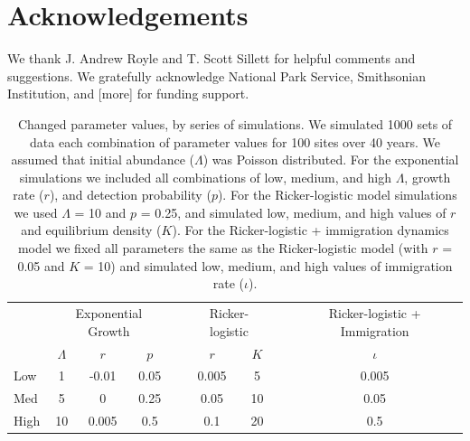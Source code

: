 \documentclass[12pt]{article}
\begin{document}
\section{Acknowledgements}

We thank J. Andrew Royle and T. Scott Sillett for helpful
comments and suggestions. We gratefully acknowledge National Park 
Service, Smithsonian Institution, and [more] for funding support.




\newpage



\begin{table}[t]
  \centering
\caption{Changed parameter values, by series of simulations.  We
simulated 1000 sets of data each combination of parameter values
for 100 sites over 40 years.  We assumed that initial abundance
($\Lambda$) was Poisson distributed.  For the exponential 
simulations we included all combinations of low, medium, and
high $\Lambda$, growth rate ($r$), and detection probability ($p$).
For the Ricker-logistic model simulations we used $\Lambda$ = 10 and $p$ = 0.25, and
simulated low, medium, and high values of $r$ and equilibrium density ($K$).
For the Ricker-logistic + immigration dynamics model we fixed all parameters the
same as the Ricker-logistic model (with $r$ = 0.05 and $K$ = 10) and
simulated low, medium, and high values of immigration rate ($\iota$).}  
\begin{tabular}{lcccccccc}
    \hline
    & \multicolumn{3}{c}{Exponential Growth} && \multicolumn{2}{c}{Ricker-logistic} &&
    Ricker-logistic + Immigration \\
    \cline{2-4}     \cline{6-7}    \cline{9-9}
& $\Lambda$ & $r$ & $p$ && $r$  & $K$ && $\iota$  \\    
\hline
    Low	        &1	&-0.01	&0.05	&&0.005	 &5	&&0.005  \\
    Med	        &5	&0	&0.25	&&0.05	&10	&&0.05   \\
    High		 &10 &0.005	&0.5	&&0.1	&20	&&0.5    \\
    \hline
  \end{tabular}
\end{table}

\vfill
\newpage
\end{document}

